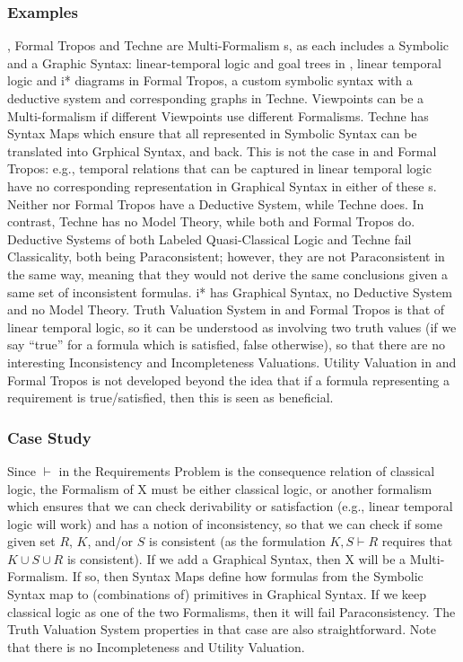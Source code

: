 \documentclass[10pt, final, conference, compsocconf]{IEEEtran}
\begin{document}
\subsubsection{Examples}
, Formal Tropos and Techne are Multi-Formalism s, as each includes a Symbolic and a Graphic Syntax: linear-temporal logic and goal trees in , linear temporal logic and i* diagrams in Formal Tropos, a custom symbolic syntax with a deductive system and corresponding graphs in Techne. Viewpoints can be a Multi-formalism  if different Viewpoints use different Formalisms. Techne has Syntax Maps which ensure that all represented in Symbolic Syntax can be translated into  Grphical Syntax, and back. This is not the case in  and Formal Tropos: e.g., temporal relations that can be captured in linear temporal logic have no corresponding representation in Graphical Syntax in either of these s. Neither  nor Formal Tropos have a Deductive System, while Techne does. In contrast, Techne has no Model Theory, while both  and Formal Tropos do. Deductive Systems of both Labeled Quasi-Classical Logic and Techne fail Classicality, both being Paraconsistent; however, they are not Paraconsistent in the same way, meaning that they would not derive the same conclusions given a same set of inconsistent formulas. i* has Graphical Syntax, no Deductive System and no Model Theory. Truth Valuation System in  and Formal Tropos is that of linear temporal logic, so it can be understood as involving two truth values (if we say ``true'' for a formula which is satisfied, false otherwise), so that there are no interesting Inconsistency and Incompleteness Valuations. Utility Valuation in  and Formal Tropos is not developed beyond the idea that if a formula representing a requirement is true/satisfied, then this is seen as beneficial.

\subsubsection{Case Study}
Since $\vdash$ in the Requirements Problem is the consequence relation of classical logic, the Formalism of X must be either classical logic, or another formalism which ensures that we can check derivability or satisfaction (e.g., linear temporal logic will work) and has a notion of inconsistency, so that we can check if some given set $R$, $K$, and/or $S$ is consistent (as the formulation $K, S \vdash R$ requires that $K \cup S \cup R$ is consistent). If we add a Graphical Syntax, then X will be a Multi-Formalism. If so, then Syntax Maps define how formulas from the Symbolic Syntax map to (combinations of) primitives in Graphical Syntax. If we keep classical logic as one of the two Formalisms, then it will fail Paraconsistency. The Truth Valuation System properties in that case are also straightforward. Note that there is no Incompleteness and Utility Valuation.
\end{document}
